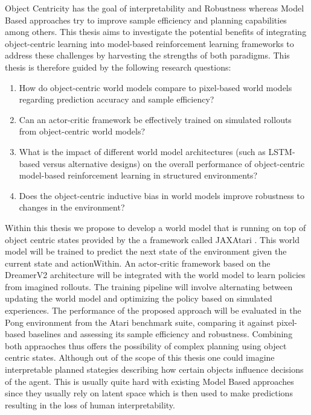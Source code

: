 \documentclass[
	english,
	ruledheaders=section,
	class=report,
	thesis={type=master},
	accentcolor=9c,
	custommargins=true,
	marginpar=false,
	parskip=half-,
	fontsize=11pt,
]{tudapub}
\begin{document}
Object Centricity has the goal of 
interpretability and Robustness whereas Model Based approaches try to improve
sample efficiency and planning capabilities among others. This
thesis aims to investigate the potential benefits of integrating object-centric
learning into model-based reinforcement learning frameworks to address these
challenges by harvesting the strengths of both paradigms. This thesis is
therefore guided by the following research questions:
\begin{enumerate}
	\item How do object-centric world models compare to pixel-based world models
	      regarding prediction accuracy and sample efficiency?
	\item Can an actor-critic framework be effectively trained on simulated rollouts from
	      object-centric world models?
	\item What is the impact of different world model architectures (such as LSTM-based
	      versus alternative designs) on the overall performance of object-centric
	      model-based reinforcement learning in structured environments?
	\item Does the object-centric inductive bias in world models improve robustness to
	      changes in the environment?
\end{enumerate}

Within this thesis we propose to develop a world model that is running on top
of object centric states provided by the a framework called JAXAtari \cite{jaxatari}. This world model will be trained to predict 
the next
state of the environment given the current state and actionWithin. An actor-critic
framework based on the DreamerV2 \cite{hafner2020dream} architecture will be integrated with the world
model to learn policies from imagined rollouts. The training pipeline will
involve alternating between updating the world model and optimizing the policy
based on simulated experiences. The performance of the proposed approach will
be evaluated in the Pong environment from the Atari benchmark suite, comparing
it against pixel-based baselines and assessing its sample efficiency and
robustness. Combining both appraoches thus offers the possibility of complex planning
using object centric states. Although out of the scope of this thesis one could imagine interpretable
planned stategies describing how certain objects influence decisions of the agent. This is usually quite hard
with existing Model Based approaches since they usually rely on latent space which is then used to make predictions
resulting in the loss of human interpretability.
\end{document}
